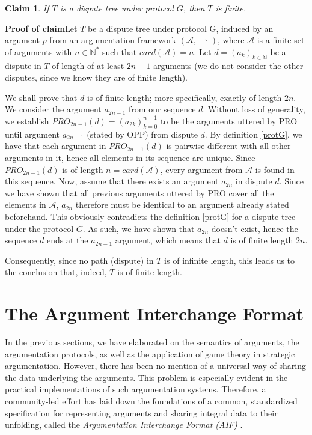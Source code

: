 \documentclass[12pt, a4paper]{article}
\newcommand{\df}{\ensuremath{\rightharpoonup}}
\newtheorem{Claim}{Claim}
\begin{document}
\begin{Claim}
	If $T$ is a dispute tree under protocol $G$, then $T$ is finite.
\end{Claim}


\noindent\textbf{Proof of claim}\quad Let $T$ be a dispute tree under protocol G, induced by an argument $p$ from an argumentation framework $(\mathcal{A}, \df)$, where $\mathcal{A}$ is a finite set of arguments with $n \in \mathbb{N^*}$ such that $card(\mathcal{A}) = n$. Let $d = (a_{k})_{k \in \mathbb{N}}$ be a dispute in $T$ of length of at least $2n - 1$ arguments (we do not consider the other disputes, since we know they are of finite length).

We shall prove that $d$ is of finite length; more specifically, exactly of length $2n$. We consider the argument $a_{2n - 1}$ from our sequence $d$. Without loss of generality, we establish $PRO_{2n-1}(d) = (a_{2k})_{k=0}^{n-1}$ to be the arguments uttered by PRO until argument $a_{2n - 1}$ (stated by OPP) from dispute $d$. By definition \ref{protG}, we have that each argument in $PRO_{2n-1}(d)$ is pairwise different with all other arguments in it, hence all elements in its sequence are unique. Since $PRO_{2n-1}(d)$ is of length $n = card(\mathcal{A})$, every argument from $\mathcal{A}$ is found in this sequence. Now, assume that there exists an argument $a_{2n}$ in dispute $d$. Since we have shown that all previous arguments uttered by PRO cover all the elements in $\mathcal{A}$, $a_{2n}$ therefore must be identical to an argument already stated beforehand. This obviously contradicts the definition \ref{protG} for a dispute tree under the protocol $G$. As such, we have shown that $a_{2n}$ doesn't exist, hence the sequence $d$ ends at the $a_{2n-1}$ argument, which means that $d$ is of finite length $2n$.

Consequently, since no path (dispute) in $T$ is of infinite length, this leads us to the conclusion that, indeed, $T$ is of finite length.


\section{The Argument Interchange Format}
In the previous sections, we have elaborated on the semantics of arguments, the argumentation protocols, as well as the application of game theory in strategic argumentation. However, there has been no mention of a universal way of sharing the data underlying the arguments. This problem is especially evident in the practical implementations of such argumentation systems. Therefore, a community-led effort has laid down the foundations of a common, standardized specification for representing arguments and sharing integral data to their unfolding, called the \emph{Argumentation Interchange Format (AIF)} \cite{aif}.
\end{document}
